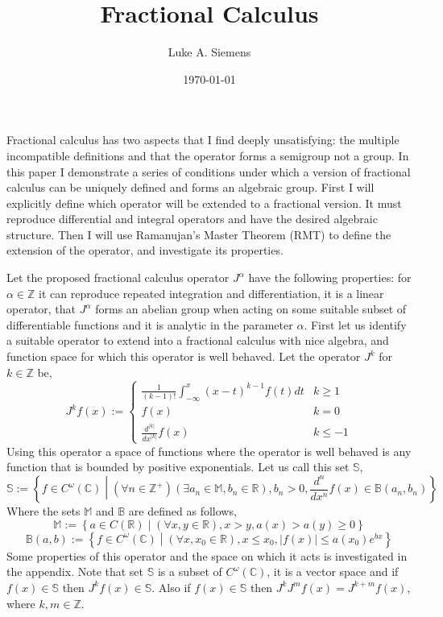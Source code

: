 \documentclass[%
 onecolumn,
 amsmath, amssymb, aps, pra, 10pt
]{revtex4-2}
\begin{document}
\title{Fractional Calculus}%
\author{Luke A. Siemens}
\noaffiliation
\date{\today}
\maketitle

Fractional calculus has two aspects that I find deeply unsatisfying: the multiple incompatible definitions and that the operator forms a semigroup not a group. In this paper I demonstrate a series of conditions under which a version of fractional calculus can be uniquely defined and forms an algebraic group. First I will explicitly define which operator will be extended to a fractional version. It must reproduce differential and integral operators and have the desired algebraic structure. Then I will use Ramanujan's Master Theorem (RMT) to define the extension of the operator, and investigate its properties.

Let the proposed fractional calculus operator $J^\alpha$ have the following properties: for $\alpha \in \mathbb{Z}$ it can reproduce repeated integration and differentiation, it is a linear operator, that $J^\alpha$ forms an abelian group when acting on some suitable subset of differentiable functions and it is analytic in the parameter $\alpha$. First let us identify a suitable operator to extend into a fractional calculus with nice algebra, and function space for which this operator is well behaved. Let the operator $J^k$ for $k \in \mathbb{Z}$ be,
\begin{equation}
J^k f(x) := \begin{cases} \frac{1}{(k-1)!}\int_{-\infty}^x (x - t)^{k - 1}f(t)dt & k \geq 1 \\ f(x) & k = 0 \\ \frac{d^{\left|k\right|}}{dx^{\left|k\right|}}f(x) & k \leq -1 \end{cases}
\label{integer_calculus}
\end{equation}
Using this operator a space of functions where the operator is well behaved is any function that is bounded by positive exponentials. Let us call this set $\mathbb{S}$,
\begin{equation}
\mathbb{S} := \left\lbrace f \in C^\omega(\mathbb{C}) \middle| (\forall n \in \mathbb{Z}^+)(\exists a_n \in \mathbb{M}, b_n \in \mathbb{R}), b_n > 0, \frac{d^n}{dx^n}f(x) \in \mathbb{B}(a_n, b_n) \right\rbrace
\label{exponentialy_bounded}
\end{equation}
Where the sets $\mathbb{M}$ and $\mathbb{B}$ are defined as follows,
\[\mathbb{M} := \left\lbrace a \in C(\mathbb{R}) \middle| (\forall x, y \in \mathbb{R}), x > y, a(x) > a(y) \geq 0 \right\rbrace\]
\[\mathbb{B}(a, b) := \left\lbrace f \in C^\omega(\mathbb{C}) \middle| (\forall x, x_0 \in \mathbb{R}), x \leq x_0, |f(x)| \leq a(x_0)e^{bx} \right\rbrace\]
Some properties of this operator and the space on which it acts is investigated in the appendix. Note that set $\mathbb{S}$ is a subset of $C^{\omega}(\mathbb{C})$, it is a vector space and if $f(x) \in \mathbb{S}$ then $J^k f(x) \in \mathbb{S}$. Also if $f(x) \in \mathbb{S}$ then $J^k J^m f(x) = J^{k + m} f(x)$, where $k, m \in \mathbb{Z}$.
\end{document}
